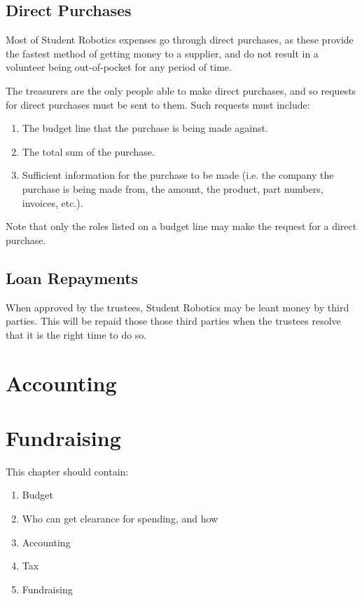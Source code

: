 \subsection{Direct Purchases}
Most of Student Robotics expenses go through direct purchases, as these provide the fastest method of getting money to a supplier, and do not result in a volunteer being out-of-pocket for any period of time.

The treasurers are the only people able to make direct purchases, and so requests for direct purchases must be sent to them.  Such requests must include:
\begin{enumerate}
\item The budget line that the purchase is being made against.
\item The total sum of the purchase.
\item Sufficient information for the purchase to be made (i.e. the company the purchase is being made from, the amount, the product, part numbers, invoices, etc.).
\end{enumerate}

Note that only the roles listed on a budget line may make the request for a direct purchase.

\subsection{Loan Repayments}

When approved by the trustees, Student Robotics may be leant money by third parties.  This will be repaid those those third parties when the trustees resolve that it is the right time to do so.

\section{Accounting}

\section{Fundraising}

This chapter should contain:
\begin{enumerate}
\item Budget
\item Who can get clearance for spending, and how
\item Accounting
\item Tax
\item Fundraising
\end{enumerate}
